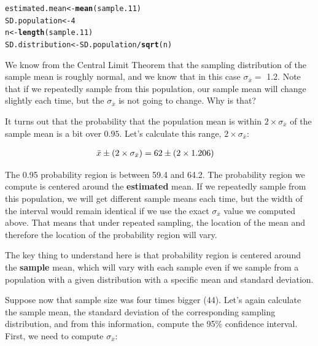 \documentclass[12pt]{book}\usepackage[]{graphicx}\usepackage[]{color}
\makeatletter
\newcommand{\hlnum}[1]{\textcolor[rgb]{0.686,0.059,0.569}{#1}}%
\newcommand{\hlopt}[1]{\textcolor[rgb]{0,0,0}{#1}}%
\newcommand{\hlstd}[1]{\textcolor[rgb]{0.345,0.345,0.345}{#1}}%
\newcommand{\hlkwb}[1]{\textcolor[rgb]{0.69,0.353,0.396}{#1}}%
\newcommand{\hlkwd}[1]{\textcolor[rgb]{0.737,0.353,0.396}{\textbf{#1}}}%
\newenvironment{kframe}{%
 \def\at@end@of@kframe{}%
 \ifinner\ifhmode%
  \def\at@end@of@kframe{\end{minipage}}%
  \begin{minipage}{\columnwidth}%
 \fi\fi%
 \def\FrameCommand##1{\hskip\@totalleftmargin \hskip-\fboxsep
 \colorbox{shadecolor}{##1}\hskip-\fboxsep
     \hskip-\linewidth \hskip-\@totalleftmargin \hskip\columnwidth}%
 \MakeFramed {\advance\hsize-\width
   \@totalleftmargin\z@ \linewidth\hsize
   \@setminipage}}%
 {\par\unskip\endMakeFramed%
 \at@end@of@kframe}
\newenvironment{knitrout}{}{} %
\makeatother
\begin{document}
\begin{knitrout}
\color{fgcolor}\begin{kframe}
\begin{alltt}
\hlstd{estimated.mean} \hlkwb{<-} \hlkwd{mean}\hlstd{(sample.11)}
\hlstd{SD.population} \hlkwb{<-} \hlnum{4}
\hlstd{n} \hlkwb{<-} \hlkwd{length}\hlstd{(sample.11)}
\hlstd{SD.distribution} \hlkwb{<-} \hlstd{SD.population}\hlopt{/}\hlkwd{sqrt}\hlstd{(n)}
\end{alltt}
\end{kframe}
\end{knitrout}

We know from the Central Limit Theorem that the sampling distribution
of the sample mean is roughly normal, and we know that in this case 
$\sigma_{\bar{x}} =$ 1.2.  
Note that if we repeatedly sample from this population, our sample mean will change slightly each time, but the $\sigma_{\bar{x}}$ is not going to change. Why is that?


It turns out that the probability that the population mean is within $2\times 
\sigma_{\bar{x}}$ of the sample mean is a bit over $0.95$. Let's
calculate this range, $2\times 
\sigma_{\bar{x}}$:

\begin{align}
\bar{x} \pm (2 \times \sigma_{\bar{x}}) & = \hbox{62} \pm (2 \times \hbox{1.206}) 
\end{align}

The 0.95 probability region is between
59.4 and
64.2.  The probability region we compute is centered around the \textbf{estimated} mean. If we repeatedly sample from this population, we will get different sample means each time, but the width of the interval would remain identical if we use the exact $\sigma_{\bar{x}}$ value we computed above. That means that under repeated sampling, the location of the mean and therefore the location of the probability region will vary. 

The key thing to understand here is that probability region is centered around the \textbf{sample} mean, which will vary with each sample even if we sample from a population with a given distribution with a specific mean and standard deviation.


Suppose now that sample size was four times bigger (44). Let's again
calculate the sample mean, the standard deviation of the corresponding 
sampling distribution, and from this information,
compute the 95\% confidence interval. First, we need to compute $\sigma_{\bar{x}}$:
\end{document}
